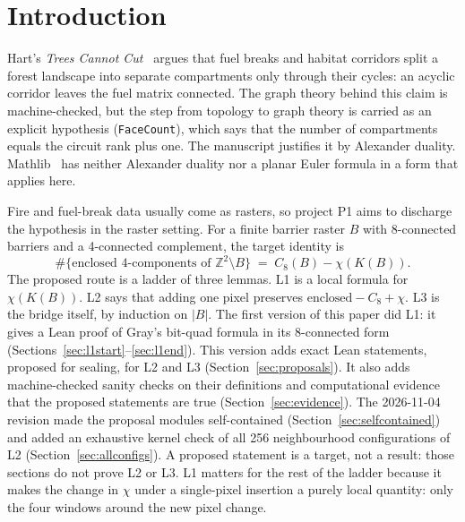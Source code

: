 \documentclass[11pt]{article}
\theoremstyle{definition}
\theoremstyle{remark}
\begin{document}
\begin{abstract}
touching the inserted pixel $p$), that every finite raster has finitely many enclosed
components, and of the change in the enclosed count. Combined with an induction in
raster-scan order, they reduced L2 to a half-plane digital Jordan lemma about the pixel
$S$ below $p$, and proved one direction of it by crossing parity. We prove the other
direction by following the crack boundary of the 8-component of the lower-right
neighbour $SE$. The (8,4) crack-successor map has an explicit left inverse, so it permutes the
finite set of cracks. Injectivity alone then forces the orbit from $S$ to reach the
pixel $E$ to the right of $p$ without passing through $p$. As a corollary, we give a Lean proof of
the bridge equation $\mathrm{enc}(B)=C_8(B)-\chi(K(B))$ for every finite raster. The
proof uses no planar topology beyond these two discrete arguments.
\end{abstract}

\section{Introduction}

Hart's \emph{Trees Cannot Cut}~\cite{Hart2026} argues that fuel breaks and
habitat corridors split a forest landscape into separate compartments only
through their cycles: an acyclic corridor leaves the fuel matrix connected. The
graph theory behind this claim is machine-checked, but the step from topology to
graph theory is carried as an explicit hypothesis (\texttt{FaceCount}), which
says that the number of compartments equals the circuit rank plus one. The
manuscript justifies it by Alexander duality. Mathlib~\cite{Mathlib2020} has
neither Alexander duality nor a planar Euler formula in a form that applies
here.

Fire and fuel-break data usually come as rasters, so project P1 aims to
discharge the hypothesis in the raster setting. For a finite barrier raster $B$
with 8-connected barriers and a 4-connected complement, the target identity is
\[
  \#\{\text{enclosed 4-components of } \mathbb{Z}^2\setminus B\}
  \;=\; C_8(B) - \chi(K(B)).
\]
The proposed route is a ladder of three lemmas. L1 is a local formula for
$\chi(K(B))$. L2 says that adding one pixel preserves
$\text{enclosed} - C_8 + \chi$. L3 is the bridge itself, by induction on $|B|$.
The first version of this paper did L1: it gives a Lean proof of Gray's
bit-quad formula in its 8-connected form (Sections~\ref{sec:l1start}--\ref{sec:l1end}).
This version adds exact Lean statements, proposed for sealing, for L2 and L3
(Section~\ref{sec:proposals}). It also adds machine-checked sanity checks on
their definitions and computational evidence that the proposed statements are
true (Section~\ref{sec:evidence}). The 2026-11-04 revision made the proposal
modules self-contained (Section~\ref{sec:selfcontained}) and added an exhaustive
kernel check of all 256 neighbourhood configurations of L2
(Section~\ref{sec:allconfigs}). A proposed statement is a target, not a
result: those sections do not prove L2 or L3. L1 matters for the rest of the ladder because it makes the
change in $\chi$ under a single-pixel insertion a purely local quantity: only
the four windows around the new pixel change.
\end{document}
